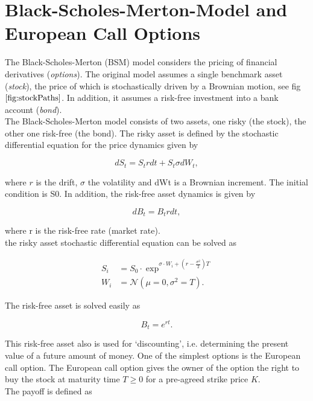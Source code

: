 \documentclass[../main.tex]{subfiles}
\begin{document}
\section{Black-Scholes-Merton-Model and European Call Options}\label{sec: bms}

The Black-Scholes-Merton (BSM) model considers the pricing of financial derivatives (\emph{options}). The original model assumes a single benchmark asset (\emph{stock}), the price of which is stochastically driven by a Brownian motion, see fig $\ref{fig:stockPaths}$. In addition, it assumes a risk-free investment into a bank account (\emph{bond}).\\

The Black-Scholes-Merton model consists of two assets, one risky (the stock), the other one risk-free (the bond). The risky asset is defined by the stochastic differential equation for the price dynamics given by

\begin{equation}
    dS_t = S_t r dt + S_t \sigma dW_t,
    \label{eq: risky}
\end{equation}

where $r$ is the drift, $\sigma$ the volatility and dWt is a Brownian increment. The initial condition is S0. In addition, the risk-free asset dynamics is given by

\begin{equation}
   dB_t = B_t r dt, 
\end{equation}

where r is the risk-free rate (market rate).\\
the risky asset stochastic differential equation can be solved as

\begin{align}
	   S_i &=S_{0}\cdot\exp^{\sigma \cdot W_i+(r-\frac{\sigma^2}{2})T} \label{eq:S_T} \\
	   W_i &= \mathcal{N}(\mu=0,\sigma^2=T) \label{eq:W_T}.
\end{align}

The risk-free asset is solved easily as

\begin{equation}
    B_t = e^{rt}.
\end{equation}

This risk-free asset also is used for ‘discounting’, i.e. determining the present value of a future amount of money.
One of the simplest options is the European call option. The European call option gives the owner of the option the right to buy the stock at maturity time $T \geq 0$ for a pre-agreed strike price $K$.\\
The payoff is defined as
\end{document}
